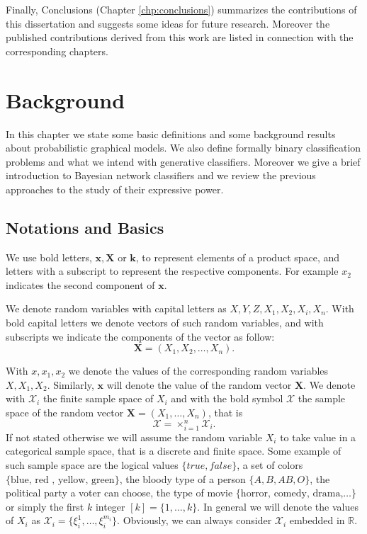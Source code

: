 \documentclass[11pt,a4paper, twoside]{book}
\newcommand{\bx}{\mathbf{x}}
\newcommand{\bX}{\mathbf{X}}
\newcommand{\bchi}{\boldsymbol{\mathcal{X}}}
\newcommand{\nchi}{\mathcal{X}}
\begin{document}
Finally, Conclusions (Chapter \ref{chp:conclusions}) summarizes the contributions of this dissertation and suggests some ideas for future research. Moreover the published contributions derived from this work are listed in connection with the corresponding chapters.


\chapter{Background}
\label{chp:background}

In this chapter we state some basic definitions and some background results about probabilistic graphical models. We also define formally binary classification problems and what we intend with generative classifiers. Moreover we give a brief introduction to Bayesian network classifiers and we review the previous approaches to the study of their expressive power.

\section{Notations and Basics}
\label{sec:notbasic}

We use bold letters, $\bx, \bX$ or $\mathbf{k}$, to represent elements of a product space, and letters with a subscript to represent the respective components. For example $x_2$ indicates the second component of $\bx$.

We denote random variables with capital letters as $X,Y,Z,X_1,X_2, X_i,X_n$. With bold capital letters we denote vectors of such random variables, and with subscripts we indicate the components of the vector as follow:
$$ \bX = (X_1, X_2, \ldots , X_n).$$

With $x,x_1,x_2$ we denote the values of the corresponding random variables $X,X_1,X_2$. Similarly, $\bx$ will denote the value of the random vector $\bX$.
We denote with $\nchi_i$ the finite sample space of $X_i$ and with the bold symbol $\bchi$ the sample space of the random vector $\bX=(X_1,\ldots,X_n)$, that is $$\bchi = \times_{i=1}^{n} \nchi_i .$$
If not stated otherwise we will assume the random variable $X_i$ to take value in a categorical sample space, that is a discrete and finite space. 
Some example of such sample space are the logical values $\{ true, false \}$, a set of colors $\{\text{blue, red , yellow, green}\}$, the bloody type of a person $\{A, B, AB, O \}$, the political party a voter can choose, the type of movie $\{\text{horror, comedy, drama,} \ldots \}$ or simply the first $k$ integer $[k]= \{ 1,\ldots, k\}$.
In general we will denote the values of $X_i$ as $\nchi_i = \{ \xi_i^{1},\ldots, \xi_i^{m_i} \}$. Obviously, we can always consider $\nchi_i$ embedded in $\mathbb{R}$.
\end{document}
